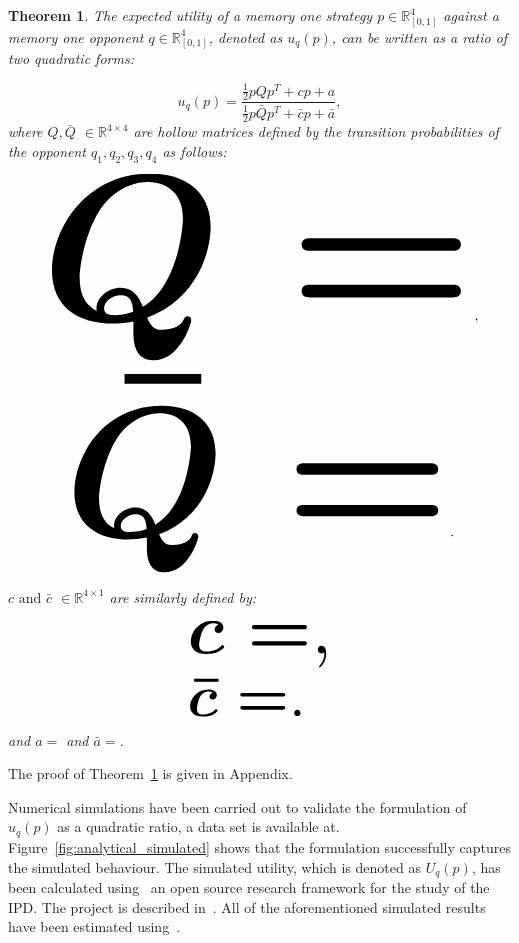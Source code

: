 \documentclass[10pt]{article}
\newcommand{\R}{\mathbb{R}}
\newtheorem{theorem}{Theorem}
\begin{document}
\begin{theorem}\label{theorem:quadratic_form_u}
    The expected utility of a memory one strategy \(p\in\mathbb{R}_{[0,1]}^4\)
    against a memory one opponent \(q\in\mathbb{R}_{[0,1]}^4\), denoted
    as \(u_q(p)\), can be written as a ratio of two quadratic forms:

    \begin{equation}\label{eq:optimisation_quadratic}
    u_q(p) = \frac{\frac{1}{2}pQp^T + cp + a}
                {\frac{1}{2}p\bar{Q}p^T + \bar{c}p + \bar{a}},
    \end{equation}
    where \(Q, \bar{Q}\) \(\in \R^{4\times4}\) are hollow matrices defined by the
    transition probabilities of the opponent \(q_1, q_2, q_3, q_4\) as follows:

    \begin{center}
    \begin{equation}
    \resizebox{0.9\linewidth}{!}{\arraycolsep=2.5pt%
    \boldmath\(
    Q = \)},
    \end{equation}
    \begin{equation}\label{eq:q_bar_matrix}
    \resizebox{0.8\linewidth}{!}{\arraycolsep=2.5pt%
    \boldmath\(
    \bar{Q} =  \)}.
    \end{equation}
    \end{center}

    \(c \text{ and } \bar{c}\) \(\in \R^{4 \times 1}\) are similarly defined by:

    \begin{equation}\label{eq:q_matrix_numerator}
    \resizebox{0.3\linewidth}{!}{\arraycolsep=2.5pt%
    \boldmath\(c = \),}
    \end{equation}
    \begin{equation}\label{eq:q_matrix_denominator}
    \resizebox{0.3\linewidth}{!}{\arraycolsep=2.5pt%
    \boldmath\(\bar{c} = \).
    }
    \end{equation}
    and \(a = \) and
    \(\bar{a} = \).
\end{theorem}

The proof of Theorem~\ref{theorem:quadratic_form_u} is given in Appendix. %

Numerical simulations have been carried out to validate the formulation of
\(u_q(p)\) as a quadratic ratio, a data set is available at.
Figure~\ref{fig:analytical_simulated} shows that the formulation successfully
captures the simulated behaviour. The simulated utility, which is denoted as
\(U_q(p)\), has been calculated using~\cite{axelrodproject} an open source
research framework for the study of the IPD. The project is described
in~\cite{Knight2016}. All of the aforementioned simulated results have been
estimated using~\cite{axelrodproject}.
\end{document}
